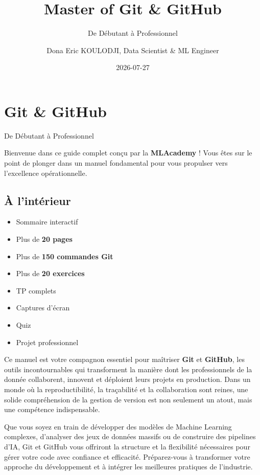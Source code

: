 \documentclass[
  letterpaper,
  DIV=11,
  numbers=noendperiod]{scrreprt}
\title{Master of Git \& GitHub}
\subtitle{De Débutant à Professionnel}
\author{Dona Eric KOULODJI, Data Scientist \& ML Engineer}
\date{2026-07-27}
\providecommand{\tightlist}{%
  \setlength{\itemsep}{0pt}\setlength{\parskip}{0pt}}
\renewcommand*\contentsname{Table of contents}
\newcommand\contentsname{Table of contents}
\begin{document}
\maketitle

\renewcommand*\contentsname{Table of contents}
{
\setcounter{tocdepth}{2}
\tableofcontents
}


\section{Git \& GitHub}\label{git-github}

De Débutant à Professionnel

\hfill\break

Bienvenue dans ce guide complet conçu par la \textbf{MLAcademy} ! Vous
êtes sur le point de plonger dans un manuel fondamental pour vous
propulser vers l'excellence opérationnelle.

\subsection{À l'intérieur}\label{uxe0-lintuxe9rieur}

\begin{itemize}
\tightlist
\item
  Sommaire interactif
\item
  Plus de \textbf{20 pages}
\item
  Plus de \textbf{150 commandes Git}
\item
  Plus de \textbf{20 exercices}
\item
  TP complets
\item
  Captures d'écran
\item
  Quiz
\item
  Projet professionnel
\end{itemize}

Ce manuel est votre compagnon essentiel pour maîtriser \textbf{Git} et
\textbf{GitHub}, les outils incontournables qui transforment la manière
dont les professionnels de la donnée collaborent, innovent et déploient
leurs projets en production. Dans un monde où la reproductibilité, la
traçabilité et la collaboration sont reines, une solide compréhension de
la gestion de version est non seulement un atout, mais une compétence
indispensable.

Que vous soyez en train de développer des modèles de Machine Learning
complexes, d'analyser des jeux de données massifs ou de construire des
pipelines d'IA, Git et GitHub vous offriront la structure et la
flexibilité nécessaires pour gérer votre code avec confiance et
efficacité. Préparez-vous à transformer votre approche du développement
et à intégrer les meilleures pratiques de l'industrie.
\end{document}
